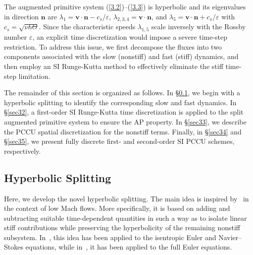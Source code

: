 \documentclass[a4paper,11pt,twoside]{article}
\numberwithin{equation}{section}
\numberwithin{figure}{section}
\numberwithin{table}{section}
\newcommand{\eps}{\varepsilon}
\newcommand{\bn}{\bm{n}}
\newcommand{\bv}{\bm{v}}
\newcommand\eref[1]{(\ref{#1})}
\newcommand{\RIIIcolor}[1]{{\leavevmode\color{magenta} #1}}
\begin{document}
The augmented primitive system \eref{3.2}--\eref{3.3} is hyperbolic and its eigenvalues in direction $\bn$ are
$\lambda_1=\bv\cdot\bn-c_s/\eps$, $\lambda_{2,3,4}=\bv\cdot\bn$, and $\lambda_5=\bv\cdot\bn+c_s/\eps$ with $c_s=\sqrt{\nu h\Theta}$. Since
the characteristic speeds $\lambda_{1,5}$ scale inversely with the Rossby number $\eps$, an explicit time discretization would impose a
severe time-step restriction. To address this issue, we first decompose the fluxes into two components associated with the slow (nonstiff)
and fast (stiff) dynamics, and then employ an SI Runge-Kutta method to effectively eliminate the stiff time-step limitation.

The remainder of this section is organized as follows. In \S\ref{sec31}, we begin with a hyperbolic splitting to identify the corresponding 
slow and fast dynamics. In \S\ref{sec32}, a first-order SI Runge-Kutta time discretization is applied to the split augmented primitive
system to ensure the AP property. In \S\ref{sec33}, we describe the PCCU spatial discretization for the nonstiff terms. Finally, in
\S\ref{sec34} and \S\ref{sec35}, we present fully discrete first- and second-order SI PCCU schemes, respectively.
		
\subsection{Hyperbolic Splitting}\label{sec31}
\RIIIcolor{Here, we develop the novel hyperbolic splitting. The main idea is inspired by~\cite{Haack_2012,CKKM} in the context of low Mach flows. More specifically, it is based on adding and subtracting suitable time-dependent quantities in such a way as to isolate linear stiff contributions while preserving the hyperbolicity of the remaining nonstiff subsystem. In~\cite{Haack_2012}, this idea has been applied to the isentropic Euler and Navier--Stokes equations, while in~\cite{CKKM}, it has been applied to the full Euler equations.}
\end{document}
